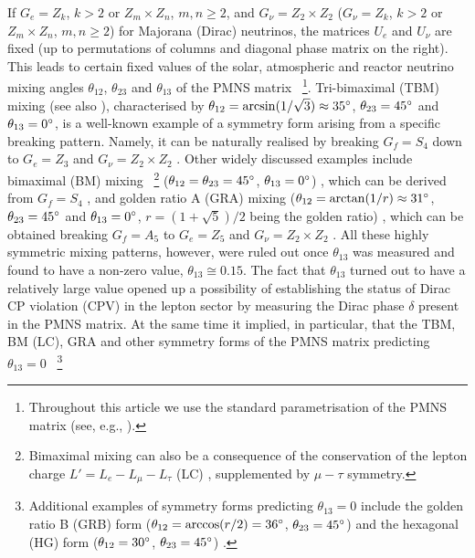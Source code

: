 \documentclass[11pt,a4paper]{article}
\def\th{\theta}
\numberwithin{equation}{section}
\begin{document}
 If $G_e = Z_k$, $k > 2$ or $Z_m \times Z_n$, $m,n \geq 2$, and 
$G_\nu = Z_2 \times Z_2$ ($G_\nu = Z_k$, $k > 2$ or $Z_m \times Z_n$, 
$m,n \geq 2$) for Majorana (Dirac) neutrinos, the matrices $U_e$ and $U_\nu$ 
are fixed (up to permutations of columns and diagonal phase 
matrix on the right). This leads to certain fixed values of 
the solar, atmospheric and reactor 
neutrino mixing angles $\th_{12}$, $\th_{23}$ and $\th_{13}$ 
of the PMNS matrix~%
\footnote{Throughout this article we use the standard parametrisation 
of the PMNS matrix (see, e.g., \cite{Patrignani:2016xqp}).}.
Tri-bimaximal (TBM) mixing
\cite{Harrison:2002er,Harrison:2002kp,Xing:2002sw,He:2003rm} 
(see also \cite{Wolfenstein:1978uw}), characterised by 
$\th_{12} = \arcsin(1/\sqrt{3}) \approx 35\degree$, 
$\th_{23} = 45\degree$ and $\th_{13} = 0\degree$, 
is a well-known example of a symmetry form 
arising from a specific breaking pattern.
Namely, it can be naturally realised by breaking $G_f = S_4$ 
down to $G_e = Z_3$ and $G_\nu = Z_2 \times Z_2$ \cite{Lam:2008rs}. 
Other widely discussed examples include bimaximal (BM) mixing~%
\footnote{Bimaximal mixing can also be  
a consequence of the conservation of the lepton charge
$L' = L_e - L_{\mu} - L_{\tau}$ (LC) \cite{Petcov:1982ya}, 
supplemented by $\mu - \tau$ symmetry.}
($\th_{12} = \th_{23} = 45\degree$, $\th_{13} = 0\degree$) 
\cite{Vissani:1997pa,Barger:1998ta,Baltz:1998ey}, 
which can be derived from $G_f = S_4$ 
\cite{Altarelli:2009gn,Meloni:2011fx,Ding:2013eca}, and 
golden ratio A (GRA) mixing ($\th_{12} = \arctan(1/r) \approx 31\degree$, 
$\th_{23} = 45\degree$ and $\th_{13} = 0\degree$, 
$r=(1+\sqrt{5})/2$ being the golden ratio)
\cite{Datta:2003qg,Kajiyama:2007gx}, 
which can be obtained 
breaking $G_f = A_5$ to $G_e = Z_5$ and $G_\nu = Z_2 \times Z_2$ 
\cite{Everett:2008et,Ding:2011cm}. 
All these highly symmetric mixing patterns, however,
were ruled out once $\th_{13}$ was measured 
and found to have a non-zero value, $\theta_{13}\cong 0.15$. 
The fact that $\theta_{13}$ turned out to have a relatively large value
opened up a possibility of 
establishing the status of Dirac CP violation (CPV) in the lepton sector  
by measuring the Dirac phase $\delta$ present in the PMNS matrix. 
At the same time it implied, in particular, that 
the TBM, BM (LC), GRA and other symmetry forms of the PMNS matrix 
predicting $\theta_{13} = 0$~%
\footnote{Additional examples of symmetry forms predicting $\theta_{13} = 0$ 
include the golden ratio B (GRB) form 
($\th_{12} = \arccos(r/2) = 36\degree$, $\th_{23} = 45\degree$) 
\cite{Rodejohann:2008ir,Adulpravitchai:2009bg}
and the hexagonal (HG) form 
($\th_{12} = 30\degree$, $\th_{23} = 45\degree$)
\cite{Albright:2010ap,Kim:2010zub}.}
\end{document}
